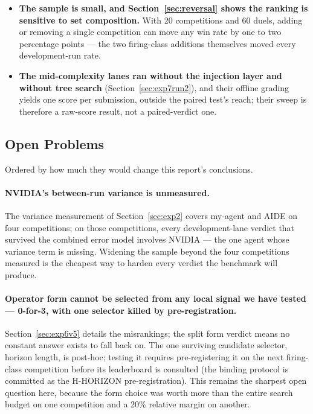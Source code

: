 \documentclass[11pt,a4paper]{article}
\begin{document}
\begin{itemize}[leftmargin=*]
  \item \textbf{The sample is small, and Section~\ref{sec:reversal} shows the ranking is sensitive to set composition.} With 20 competitions and 60 duels, adding or removing a single competition can move any win rate by one to two percentage points --- the two firing-class additions themselves moved every development-run rate.
  \item \textbf{The mid-complexity lanes ran without the injection layer and without tree search} (Section~\ref{sec:exp7run2}), and their offline grading yields one score per submission, outside the paired test's reach; their sweep is therefore a raw-score result, not a paired-verdict one.
\end{itemize}

\subsection{Open Problems}
\label{sec:future}

Ordered by how much they would change this report's conclusions.

\paragraph{NVIDIA's between-run variance is unmeasured.} The variance measurement of Section~\ref{sec:exp2} covers my-agent and AIDE on four competitions; on those competitions, every development-lane verdict that survived the combined error model involves NVIDIA --- the one agent whose variance term is missing. Widening the sample beyond the four competitions measured is the cheapest way to harden every verdict the benchmark will produce.

\paragraph{Operator form cannot be selected from any local signal we have tested --- 0-for-3,
with one selector killed by pre-registration.} Section~\ref{sec:exp6v5} details the
misrankings; the split form verdict means no constant answer exists to fall back on. The one
surviving candidate selector, horizon length, is post-hoc; testing it requires pre-registering
it on the next firing-class competition before its leaderboard is consulted (the binding
protocol is committed as the H-HORIZON pre-registration). This remains the sharpest open
question here, because the form choice was worth more than the entire search budget on one
competition and a 20\% relative margin on another.
\end{document}
